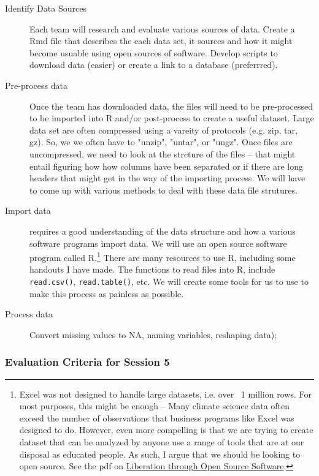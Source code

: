 \documentclass{article}\usepackage[]{graphicx}\usepackage[]{color}
\begin{document}
\begin{description}
  \item[Identify Data Sources] Each team will research and evaluate various sources of data. Create a Rmd file that describes the each data set, it sources and how it might become usuable using open sources of software. Develop scripts to download data (easier) or create a link to a database (preferrred). 
  \item[Pre-process data] Once the team has downloaded data, the files will need to be pre-processed to be imported into R and/or post-process to create a useful dataset. Large data set are often compressed using a vareity of protocols (e.g. zip, tar, gz). So, we we often have to "unzip", "untar", or "ungz". Once files are uncompressed, we need to look at the strcture of the files -- that might entail figuring how how columns have been separated or if there are long headers that might get in the way of the importing process. We will have to come up with various methods to deal with these data file strutures. 
  \item[Import data] requires a good understanding of the data structure and how a various software programs import data. We will use an open source software program called R.\footnote{Excel was not designed to handle large datasets, i.e. over ~1 million rows. For most purposes, this might be enough -- Many climate science data often exceed the number of observations that business programs like Excel was designed to do. However, even more compelling is that we are trying to create dataset that can be analyzed by anyone use a range of tools that are at our disposal as educated people. As such, I argue that we should be looking to open source. See the pdf on \href{https://rstudio.campus.pomona.edu/s/c2d027b9f6ba35ba4d250/files/github/Climate_Change_Narratives/Data/Liberation_via_Open_Source_Software.pdf}{Liberation through Open Source Software}.
} There are many resources to use R, including some handouts I have made. The functions to read files into R, include \texttt{read.csv()}, \texttt{read.table()}, etc. We will create some tools for us to use to make this process as painless as possible. 
  \item[Process data] Convert missing values to NA, naming variables, reshaping data);
\end{description}


\subsubsection{Evaluation Criteria for Session 5}
\end{document}
